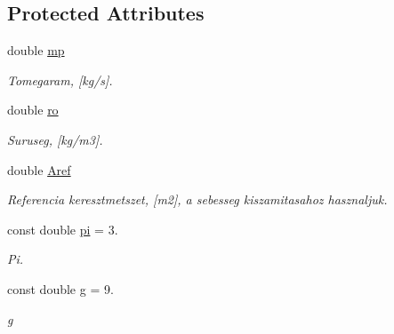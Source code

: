 \subsection*{Protected Attributes}
\begin{DoxyCompactItemize}
\item 
\mbox{\label{class_agelem_a1377d80d8511cc4adacccba31d28282d}} 
double \hyperlink{class_agelem_a1377d80d8511cc4adacccba31d28282d}{mp}
\begin{DoxyCompactList}\small\item\em Tomegaram, \mbox{[}kg/s\mbox{]}. \end{DoxyCompactList}\item 
\mbox{\label{class_agelem_a520072191e53f368a04ca80b8b583a3f}} 
double \hyperlink{class_agelem_a520072191e53f368a04ca80b8b583a3f}{ro}
\begin{DoxyCompactList}\small\item\em Suruseg, \mbox{[}kg/m3\mbox{]}. \end{DoxyCompactList}\item 
\mbox{\label{class_agelem_a3f8668febc2958fd539997d537552f17}} 
double \hyperlink{class_agelem_a3f8668febc2958fd539997d537552f17}{Aref}
\begin{DoxyCompactList}\small\item\em Referencia keresztmetszet, \mbox{[}m2\mbox{]}, a sebesseg kiszamitasahoz hasznaljuk. \end{DoxyCompactList}\item 
\mbox{\label{class_agelem_a994d67cc2ee3be36159a774681625134}} 
const double \hyperlink{class_agelem_a994d67cc2ee3be36159a774681625134}{pi} = 3.
\begin{DoxyCompactList}\small\item\em Pi. \end{DoxyCompactList}\item 
\mbox{\label{class_agelem_ab382ba1135a9aae3a5fd817f5746be43}} 
const double \hyperlink{class_agelem_ab382ba1135a9aae3a5fd817f5746be43}{g} = 9.
\begin{DoxyCompactList}\small\item\em g \end{DoxyCompactList}\item 
\mbox{\label{class_agelem_abe92b7e3912367d5d1caf6b277ca0b7d}} 

\end{DoxyCompactItemize}
